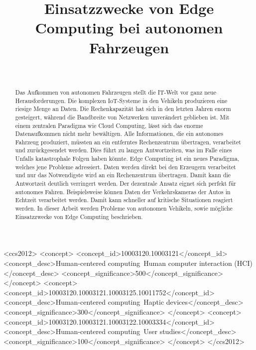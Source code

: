 \documentclass{sigchi}
\def\plaintitle{Einsatzzwecke von Edge Computing bei autonomen Fahrzeugen}
\begin{document}
\title{\plaintitle}

\author{%
   \\
}

\maketitle

\begin{abstract}
Das Aufkommen von autonomen Fahrzeugen stellt die IT-Welt vor ganz neue Herausforderungen. Die komplexen IoT-Systeme in den Vehikeln produzieren eine riesige Menge an Daten. Die Rechenkapazität hat sich in den letzten Jahren enorm gesteigert, während die Bandbreite von Netzwerken unverändert geblieben ist. Mit einem zentralen Paradigma wie Cloud Computing, lässt sich das enorme Datenaufkommen nicht mehr bewältigen. Alle Informationen, die ein autonomes Fahrzeug produziert, müssten an ein entferntes Rechenzentrum übertragen, verarbeitet und zurückgesendet werden. Dies führt zu langen Antwortzeiten, was im Falle eines Unfalls katastrophale Folgen haben könnte. Edge Computing ist ein neues Paradigma, welches jene Probleme adressiert. Daten werden direkt bei den Erzeugern verarbeitet und nur das Notwendigste wird an ein Rechenzentrum übertragen. Damit kann die Antwortzeit deutlich verringert werden. Der dezentrale Ansatz eignet sich perfekt für autonomes Fahren. Beispielsweise können Daten der Verkehrskameras der Autos in Echtzeit verarbeitet werden. Damit kann schneller auf kritische Situationen reagiert werden. In dieser Arbeit werden Probleme von autonomen Vehikeln, sowie mögliche Einsatzzwecke von Edge Computing beschrieben.
\end{abstract}


\iffalse

\begin{CCSXML}
    <ccs2012>
    <concept>
    <concept_id>10003120.10003121</concept_id>
    <concept_desc>Human-centered computing~Human computer interaction (HCI)</concept_desc>
    <concept_significance>500</concept_significance>
    </concept>
    <concept>
    <concept_id>10003120.10003121.10003125.10011752</concept_id>
    <concept_desc>Human-centered computing~Haptic devices</concept_desc>
    <concept_significance>300</concept_significance>
    </concept>
    <concept>
    <concept_id>10003120.10003121.10003122.10003334</concept_id>
    <concept_desc>Human-centered computing~User studies</concept_desc>
    <concept_significance>100</concept_significance>
    </concept>
    </ccs2012>
    \end{CCSXML}
    
\end{document}
